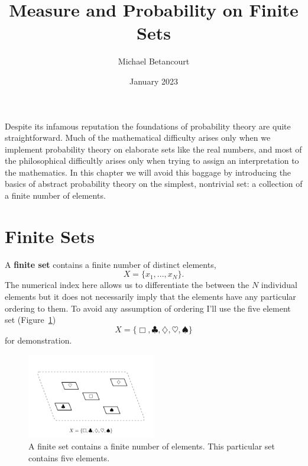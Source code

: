 \documentclass[
  letterpaper,
  DIV=11,
  numbers=noendperiod]{scrartcl}
\title{Measure and Probability on Finite Sets}
\author{Michael Betancourt}
\date{January 2023}
\renewcommand*\contentsname{Table of contents}
\newcommand\contentsname{Table of contents}
\begin{document}
\maketitle
\ifdefined\Shaded\renewenvironment{Shaded}{\begin{tcolorbox}[frame hidden, borderline west={3pt}{0pt}{shadecolor}, interior hidden, enhanced, breakable, boxrule=0pt, sharp corners]}{\end{tcolorbox}}\fi

\renewcommand*\contentsname{Table of contents}
{
\hypersetup{linkcolor=}
\setcounter{tocdepth}{3}
\tableofcontents
}
Despite its infamous reputation the foundations of probability theory
are quite straightforward. Much of the mathematical difficulty arises
only when we implement probability theory on elaborate sets like the
real numbers, and most of the philosophical difficultly arises only when
trying to assign an interpretation to the mathematics. In this chapter
we will avoid this baggage by introducing the basics of abstract
probability theory on the simplest, nontrivial set: a collection of a
finite number of elements.

\hypertarget{finite-sets}{%
\section{Finite Sets}\label{finite-sets}}

A \textbf{finite set} contains a finite number of distinct elements, \[
X = \{x_1, ..., x_N\}.
\] The numerical index here allows us to differentiate the between the
\(N\) individual elements but it does not necessarily imply that the
elements have any particular ordering to them. To avoid any assumption
of ordering I'll use the five element set (Figure~\ref{fig-ambient_set})
\[
X = \{\Box, \clubsuit, \diamondsuit, \heartsuit, \spadesuit\}
\] for demonstration.

\begin{figure}

{\centering \includegraphics[width=0.5\textwidth,height=\textheight]{figures/ambient_set/ambient_set.pdf}

}

\caption{\label{fig-ambient_set}A finite set contains a finite number of
elements. This particular set contains five elements.}

\end{figure}
\end{document}
